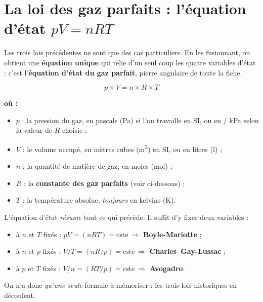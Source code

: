 \documentclass[11pt,a4paper]{article}
\newenvironment{ou}{%
  \par\smallskip\noindent\textbf{où :}\nopagebreak
  \begin{itemize}[leftmargin=1.8em,topsep=2pt,itemsep=1.5pt,parsep=0pt]}%
  {\end{itemize}}
\newcommand{\gp}{gaz parfait}
\newcommand{\GP}{gaz parfaits}
\begin{document}
\section{La loi des gaz parfaits : l'équation d'état \texorpdfstring{$pV=nRT$}{pV=nRT}}
Les trois lois précédentes ne sont que des cas particuliers. En les fusionnant, on obtient une
\textbf{équation unique} qui relie d'un seul coup les quatre variables d'état : c'est l'\textbf{équation
d'état du \gp}, pierre angulaire de toute la fiche.

\begin{formule}
\[ \boxed{\,p\times V = n\times R\times T\,} \]
\end{formule}

\begin{ou}
  \item $p$ : la pression du gaz, en pascals (\si{\pascal}) si l'on travaille en SI, ou en \si{\atm} /
        \si{\kilo\pascal} selon la valeur de $R$ choisie ;
  \item $V$ : le volume occupé, en mètres cubes (\si{\meter\cubed}) en SI, ou en litres (\si{\litre}) ;
  \item $n$ : la quantité de matière de gaz, en moles (\si{\mole}) ;
  \item $R$ : la \textbf{constante des \GP} (voir ci-dessous) ;
  \item $T$ : la température absolue, \emph{toujours} en kelvins (\si{\kelvin}).
\end{ou}

\begin{remarque}[comment $pV=nRT$ contient les trois lois]
L'équation d'état \emph{résume} tout ce qui précède. Il suffit d'y fixer deux variables :
\begin{itemize}[leftmargin=1.6em,topsep=2pt,itemsep=1.5pt]
  \item à $n$ et $T$ fixés : $pV = (nRT)=\text{cste}\ \Rightarrow$ \textbf{Boyle-Mariotte} ;
  \item à $n$ et $p$ fixés : $V/T = (nR/p)=\text{cste}\ \Rightarrow$ \textbf{Charles--Gay-Lussac} ;
  \item à $p$ et $T$ fixés : $V/n = (RT/p)=\text{cste}\ \Rightarrow$ \textbf{Avogadro}.
\end{itemize}
On n'a donc \emph{qu'une seule} formule à mémoriser : les trois lois historiques en découlent.
\end{remarque}
\end{document}
